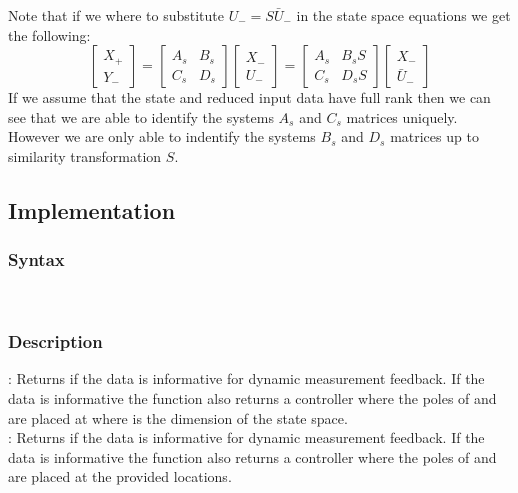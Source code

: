 Note that if we where to substitute $U_- = S\bar{U}_-$ in the state space equations we get the following:
\[ \begin{bmatrix} X_{+} \\ Y_{-} \end{bmatrix} = 
\begin{bmatrix} A_s & B_s \\ C_s & D_s \end{bmatrix} 
\begin{bmatrix} X_{-} \\ U_{-} \end{bmatrix} = 
\begin{bmatrix} A_s & B_sS \\ C_s & D_sS \end{bmatrix} 
\begin{bmatrix} X_{-} \\ \bar{U}_{-} \end{bmatrix}
 \]
If we assume that the state and reduced input data have full rank then we can see that we are able to identify the systems $A_s$ and $C_s$ matrices uniquely. However we are only able to indentify the systems $B_s$ and $D_s$ matrices up to similarity transformation $S$.

\subsection{Implementation}
\subsubsection*{Syntax} 
 \\

\subsubsection*{Description} 
: Returns if the data is informative for dynamic measurement feedback. If the data is informative the function also returns a controller  where the poles of  and  are placed at  where  is the dimension of the state space.\\
: Returns if the data is informative for dynamic measurement feedback. If the data is informative the function also returns a controller  where the poles of  and  are placed at the provided locations.

